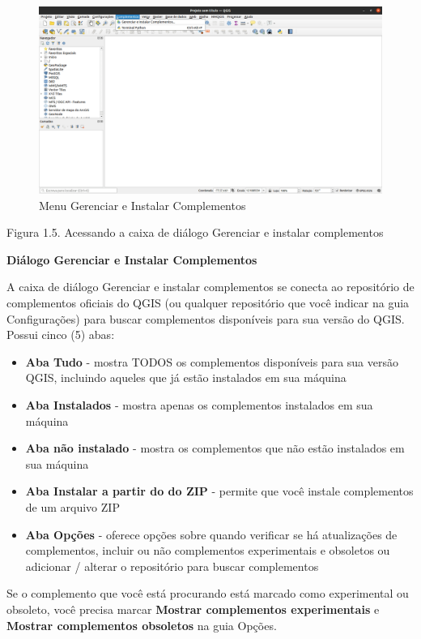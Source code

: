 \documentclass[
]{krantz}
\providecommand{\tightlist}{%
  \setlength{\itemsep}{0pt}\setlength{\parskip}{0pt}}
\begin{document}
\begin{figure}
\centering
\includegraphics{media/modulo1/plugins-menu.png}
\caption{Menu Gerenciar e Instalar Complementos}
\end{figure}

Figura 1.5. Acessando a caixa de diálogo Gerenciar e instalar complementos

\textbf{Diálogo Gerenciar e Instalar Complementos}

A caixa de diálogo Gerenciar e instalar complementos se conecta ao repositório de complementos oficiais do QGIS (ou qualquer repositório que você indicar na guia Configurações) para buscar complementos disponíveis para sua versão do QGIS. Possui cinco (5) abas:

\begin{itemize}
\tightlist
\item
  \textbf{Aba Tudo} - mostra TODOS os complementos disponíveis para sua versão QGIS, incluindo aqueles que já estão instalados em sua máquina
\item
  \textbf{Aba Instalados} - mostra apenas os complementos instalados em sua máquina
\item
  \textbf{Aba não instalado} - mostra os complementos que não estão instalados em sua máquina
\item
  \textbf{Aba Instalar a partir do do ZIP} - permite que você instale complementos de um arquivo ZIP
\item
  \textbf{Aba Opções} - oferece opções sobre quando verificar se há atualizações de complementos, incluir ou não complementos experimentais e obsoletos ou adicionar / alterar o repositório para buscar complementos
\end{itemize}

Se o complemento que você está procurando está marcado como experimental ou obsoleto, você precisa marcar \textbf{Mostrar complementos experimentais} e \textbf{Mostrar complementos obsoletos} na guia Opções.
\end{document}
